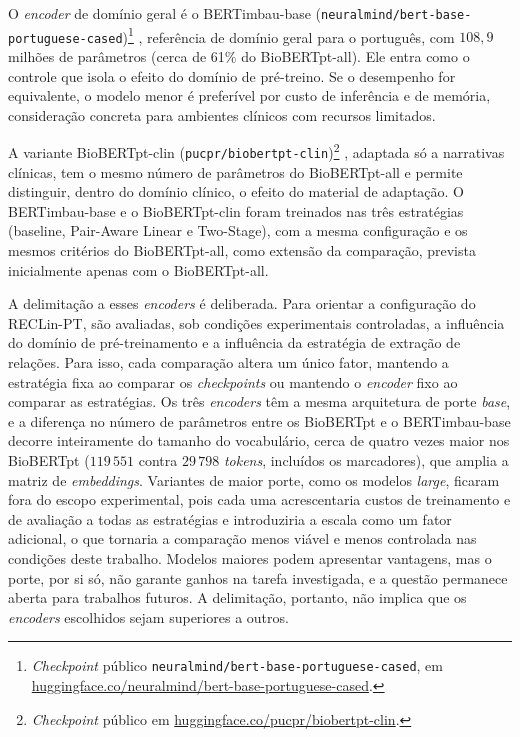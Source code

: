 O \emph{encoder} de domínio geral é o BERTimbau-base
(\texttt{neuralmind/bert-base-portuguese-cased})\footnote{\emph{Checkpoint} público \texttt{neuralmind/bert-base-portuguese-cased}, em
\href{https://huggingface.co/neuralmind/bert-base-portuguese-cased}{huggingface.co/neuralmind/bert-base-portuguese-cased}.}
\cite{souza_2020_bertimbau}, referência de domínio geral para o português, com
$108{,}9$ milhões de parâmetros (cerca de 61\% do BioBERTpt-all). Ele entra como o
controle que isola o efeito do domínio de pré-treino. Se o desempenho for
equivalente, o modelo menor é preferível por custo de inferência e de memória,
consideração concreta para ambientes clínicos com recursos limitados.

A variante BioBERTpt-clin (\texttt{pucpr/biobertpt-clin})\footnote{\emph{Checkpoint}
público em
\href{https://huggingface.co/pucpr/biobertpt-clin}{huggingface.co/pucpr/biobertpt-clin}.}
\cite{schneider_2020_biobertpt}, adaptada só a narrativas clínicas, tem o mesmo número
de parâmetros do BioBERTpt-all e permite distinguir, dentro do domínio clínico, o
efeito do material de adaptação. O BERTimbau-base e o BioBERTpt-clin foram treinados
nas três estratégias (baseline, Pair-Aware Linear e Two-Stage), com a mesma
configuração e os mesmos critérios do BioBERTpt-all, como extensão da comparação, prevista inicialmente apenas com o BioBERTpt-all.

A delimitação a esses \emph{encoders} é deliberada. Para orientar a configuração do RECLin-PT, são avaliadas, sob condições experimentais controladas, a influência do domínio de pré-treinamento e a influência da estratégia de extração de relações. Para isso, cada comparação altera um único fator, mantendo a estratégia fixa ao comparar os \emph{checkpoints} ou mantendo o \emph{encoder} fixo ao comparar as estratégias. Os três \emph{encoders} têm a mesma
arquitetura de porte \emph{base}, e a diferença no número de parâmetros entre os
BioBERTpt e o BERTimbau-base decorre inteiramente do tamanho do vocabulário, cerca de
quatro vezes maior nos BioBERTpt
($119\,551$ contra $29\,798$ \emph{tokens}, incluídos os marcadores), que amplia a
matriz de \emph{embeddings}. Variantes de maior porte, como os modelos \emph{large}, ficaram fora do escopo experimental, pois cada uma acrescentaria custos de treinamento e de avaliação a
todas as estratégias e introduziria a escala como um fator adicional, o que tornaria
a comparação menos viável e menos controlada nas condições deste trabalho. Modelos
maiores podem apresentar vantagens, mas o porte, por si só, não garante ganhos na
tarefa investigada, e a questão permanece aberta para trabalhos futuros. A
delimitação, portanto, não implica que os \emph{encoders} escolhidos sejam superiores
a outros.

